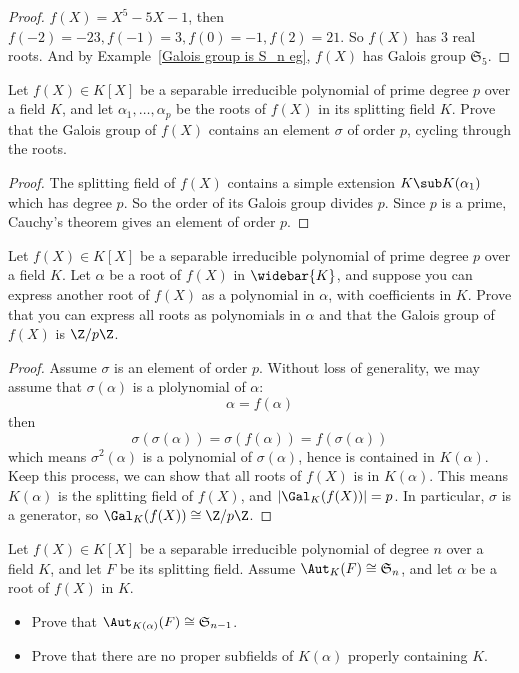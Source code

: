 \begin{proof}
$f(X)=X^5-5X-1$, then $f(-2)=-23,f(-1)=3,f(0)=-1,f(2)=21$. So $f(X)$ has $3$ real roots. And by Example~\ref{Galois group is S_n eg}, $f(X)$ has Galois group $\mathfrak{S}_5$.
\end{proof}
\begin{exercise}\label{Galois order p ele}
Let $f(X)\in K[X]$ be a separable irreducible polynomial of prime degree $p$ over a field $K$, and let $\alpha_1,\dots,\alpha_p$ be the roots of $f(X)$ in its splitting field $K$. Prove that the Galois group of $f(X)$ contains an element $\sigma$ of order $p$, cycling through the roots.
\end{exercise}
\begin{proof}
The splitting field of $f(X)$ contains a simple extension $K\sub K(\alpha_1)$ which has degree $p$. So the order of its Galois group divides $p$. Since $p$ is a prime, Cauchy's theorem gives an element of order $p$.
\end{proof}
\begin{exercise}
Let $f(X)\in K[X]$ be a separable irreducible polynomial of prime degree $p$ over a field $K$. Let $\alpha$ be a root of $f(X)$ in $\widebar{K}$, and suppose you can express another root of $f(X)$ as a polynomial in $\alpha$, with coefficients in $K$. Prove that you can express all roots as polynomials in $\alpha$ and that the Galois group of $f(X)$ is $\Z/p\Z$.
\end{exercise}
\begin{proof}
Assume $\sigma$ is an element of order $p$. Without loss of generality, we may assume that $\sigma(\alpha)$ is a plolynomial of $\alpha$:
\[\alpha=f(\alpha)\]
then 
\[\sigma(\sigma(\alpha))=\sigma(f(\alpha))=f(\sigma(\alpha))\]
which means $\sigma^2(\alpha)$ is a polynomial of $\sigma(\alpha)$, hence is contained in $K(\alpha)$. Keep this process, we can show that all roots of $f(X)$ is in $K(\alpha)$. This means $K(\alpha)$ is the splitting field of $f(X)$, and $|\Gal_K(f(X))|=p$. In particular, $\sigma$ is a generator, so $\Gal_K(f(X))\cong \Z/p\Z$.
\end{proof}
\begin{exercise}\label{Galois S_n k(alp)}
Let $f(X)\in K[X]$ be a separable irreducible polynomial of degree $n$ over a field $K$, and let $F$ be its splitting field. Assume $\Aut_K(F)\cong\mathfrak{S}_n$, and let $\alpha$ be a root of $f(X)$ in $K$.
\begin{itemize}
\item Prove that $\Aut_{K(\alpha)}(F)\cong\mathfrak{S}_{n-1}$.
\item Prove that there are no proper subfields of $K(\alpha)$ properly containing $K$.
\end{itemize}
\end{exercise}
